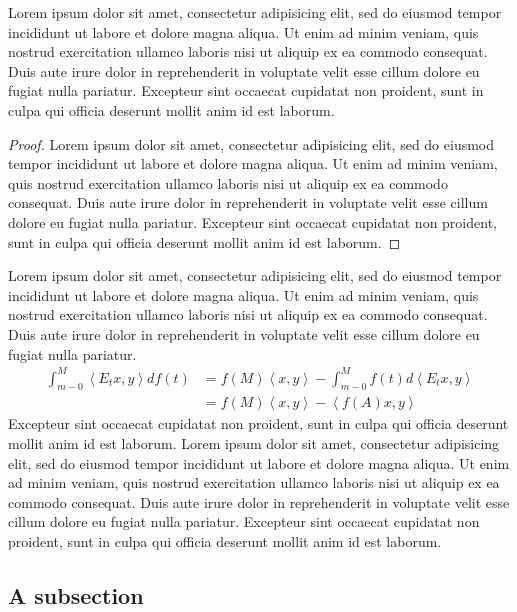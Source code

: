 \documentclass{article}
\begin{document}
Lorem ipsum dolor sit amet, consectetur adipisicing elit, sed do eiusmod tempor incididunt ut labore et dolore magna aliqua. Ut enim ad minim veniam, quis nostrud exercitation ullamco laboris nisi ut aliquip ex ea commodo consequat. Duis aute irure dolor in reprehenderit in voluptate velit esse cillum dolore eu fugiat nulla pariatur. Excepteur sint occaecat cupidatat non proident, sunt in culpa qui officia deserunt mollit anim id est laborum.

\begin{proof}
Lorem ipsum dolor sit amet, consectetur adipisicing elit, sed do eiusmod tempor incididunt ut labore et dolore magna aliqua. Ut enim ad minim veniam, quis nostrud exercitation ullamco laboris nisi ut aliquip ex ea commodo consequat. Duis aute irure dolor in reprehenderit in voluptate velit esse cillum dolore eu fugiat nulla pariatur. Excepteur sint occaecat cupidatat non proident, sunt in culpa qui officia deserunt mollit anim id est laborum.
\end{proof}

Lorem ipsum dolor sit amet, consectetur adipisicing elit, sed do eiusmod tempor incididunt ut labore et dolore magna aliqua. Ut enim ad minim veniam, quis nostrud exercitation ullamco laboris nisi ut aliquip ex ea commodo consequat. Duis aute irure dolor in reprehenderit in voluptate velit esse cillum dolore eu fugiat nulla pariatur. 
\begin{align*}
\int_{m-0}^{M}\left\langle E_{t}x,y\right\rangle df\left( t\right)
&=f\left( M\right) \left\langle x,y\right\rangle
-\int_{m-0}^{M}f\left(
t\right) d\left\langle E_{t}x,y\right\rangle \\
&=f\left( M\right) \left\langle x,y\right\rangle -\left\langle
f\left( A\right) x,y\right\rangle
\end{align*}
Excepteur sint occaecat cupidatat non proident, sunt in culpa qui officia deserunt mollit anim id est laborum. Lorem ipsum dolor sit amet, consectetur adipisicing elit, sed do eiusmod tempor incididunt ut labore et dolore magna aliqua. Ut enim ad minim veniam, quis nostrud exercitation ullamco laboris nisi ut aliquip ex ea commodo consequat. Duis aute irure dolor in reprehenderit in voluptate velit esse cillum dolore eu fugiat nulla pariatur. Excepteur sint occaecat cupidatat non proident, sunt in culpa qui officia deserunt mollit anim id est laborum.

\subsection{A subsection}
\end{document}
